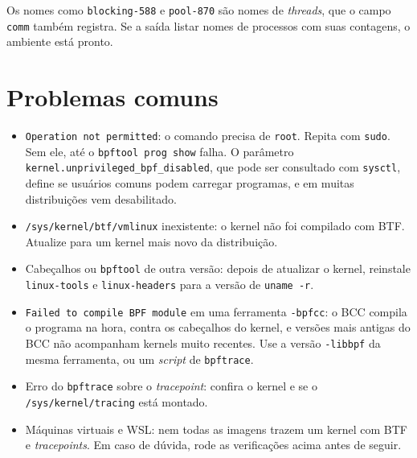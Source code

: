 Os nomes como \texttt{blocking-588} e \texttt{pool-870} são nomes de \textit{threads}, que o campo \texttt{comm} também registra. Se a saída listar nomes de processos com suas contagens, o ambiente está pronto.

\section{Problemas comuns}\label{sec:problemas}

\begin{itemize}
  \item \texttt{Operation not permitted}: o comando precisa de \texttt{root}. Repita com \texttt{sudo}. Sem ele, até o \texttt{bpftool prog show} falha. O parâmetro \texttt{kernel.unprivileged\_bpf\_disabled}, que pode ser consultado com \texttt{sysctl}, define se usuários comuns podem carregar programas, e em muitas distribuições vem desabilitado.
  \item \texttt{/sys/kernel/btf/vmlinux} inexistente: o kernel não foi compilado com BTF. Atualize para um kernel mais novo da distribuição.
  \item Cabeçalhos ou \texttt{bpftool} de outra versão: depois de atualizar o kernel, reinstale \texttt{linux-tools} e \texttt{linux-headers} para a versão de \texttt{uname -r}.
  \item \texttt{Failed to compile BPF module} em uma ferramenta \texttt{-bpfcc}: o BCC compila o programa na hora, contra os cabeçalhos do kernel, e versões mais antigas do BCC não acompanham kernels muito recentes. Use a versão \texttt{-libbpf} da mesma ferramenta, ou um \textit{script} de \texttt{bpftrace}.
  \item Erro do \texttt{bpftrace} sobre o \textit{tracepoint}: confira o kernel e se o \texttt{/sys/kernel/tracing} está montado.
  \item Máquinas virtuais e WSL: nem todas as imagens trazem um kernel com BTF e \textit{tracepoints}. Em caso de dúvida, rode as verificações acima antes de seguir.
\end{itemize}
